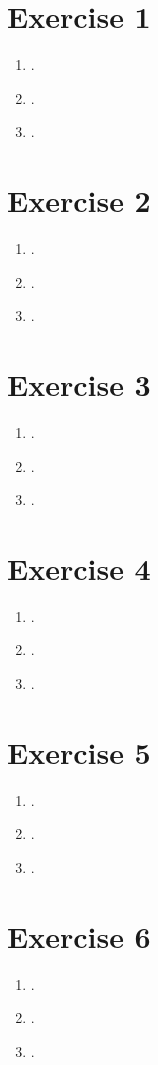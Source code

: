\documentclass{article}
\begin{document}

\section*{Exercise 1}
\begin{enumerate}[label=(\alph*)]
  \item .
  \item .
  \item .
\end{enumerate}

\section*{Exercise 2}
\begin{enumerate}[label=(\alph*)]
  \item .
  \item .
  \item .
\end{enumerate}


\section*{Exercise 3}
\begin{enumerate}[label=(\alph*)]
  \item .
  \item .
  \item .
\end{enumerate}

\section*{Exercise 4}
\begin{enumerate}[label=(\alph*)]
  \item .
  \item .
  \item .
\end{enumerate}

\section*{Exercise 5}
\begin{enumerate}[label=(\alph*)]
  \item .
  \item .
  \item .
\end{enumerate}

\section*{Exercise 6}
\begin{enumerate}[label=(\alph*)]
  \item .
  \item .
  \item .
\end{enumerate}
\end{document}
